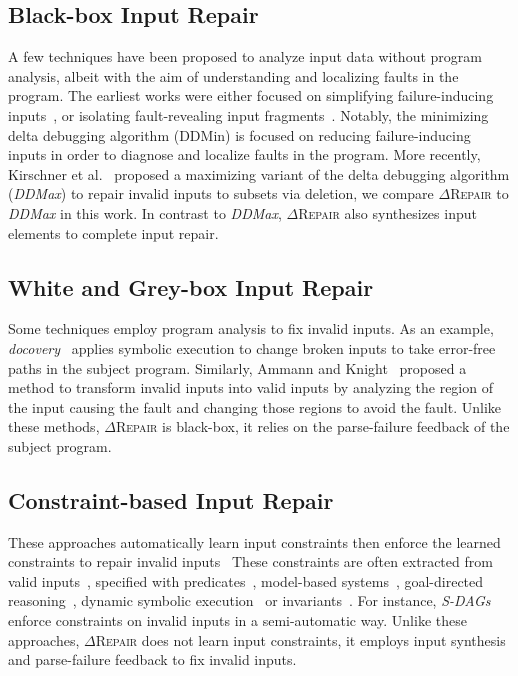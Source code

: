 \documentclass[acmsmall,screen,review,anonymous]{acmart}
\newcommand{\ddmin}{\textit{ddmin}\xspace}
\newcommand{\approach}{\textsc{$\Delta$Repair}\xspace}
\def\ddmin{DDMin\xspace}
\newcommand{\ddmax}{\textit{DDMax}\xspace}
\begin{document}
\subsection{Black-box Input Repair} 
A few techniques have been proposed to analyze input data without program analysis, albeit with the aim of understanding and localizing faults in the program. The earliest works were either focused on simplifying failure-inducing inputs~\cite{zeller2002simplifying, clause2009penumbra}, or isolating fault-revealing input fragments~\cite{hierarchicalDD, sterling2007automated}. Notably, the minimizing delta debugging algorithm (\ddmin) is focused on reducing failure-inducing inputs in order to diagnose and localize faults in the program. More recently, Kirschner et al.~\cite{kirschner2020debugging} proposed a maximizing variant of the delta debugging algorithm (\ddmax) to repair invalid inputs to subsets via deletion, we compare \approach to \ddmax in this work. In contrast to \ddmax, \approach also synthesizes input elements to complete input repair. 


\subsection{White and Grey-box Input Repair} Some techniques employ program analysis to fix invalid inputs. As an example, \emph{docovery}~\cite{docovery:ase14} applies symbolic execution to change broken inputs to take error-free paths in the subject program. Similarly, Ammann and Knight~\cite{data_diversity} proposed a method to transform invalid inputs into valid inputs by analyzing the region of the input causing the fault and changing those regions to avoid the fault. Unlike these methods, \approach 
is black-box, it relies on the parse-failure feedback of the subject program. 


\subsection{Constraint-based Input Repair} %
These approaches automatically learn input constraints then enforce the learned constraints to repair invalid inputs~\cite{hussain2010dynamic, Demsky:2006:IED:1146238.1146266} 
These constraints are often extracted from valid inputs~\cite{Long:2012:AIR:2337223.2337233, Rinard:2007:LCZ:1297027.1297072}, specified with predicates~\cite{elkarablieh2008juzi}, model-based systems~\cite{Demsky:2003:ADR:949343.949314}, goal-directed reasoning~\cite{1553560}, dynamic symbolic execution~\cite{hussain2010dynamic} or invariants~\cite{Demsky:2006:IED:1146238.1146266}. For instance, \emph{S-DAGs}~\cite{scheffczyk2004s} enforce constraints on invalid inputs in a semi-automatic way. Unlike these approaches, \approach does not learn input constraints, it employs input synthesis and parse-failure feedback to fix invalid inputs. 
\end{document}
